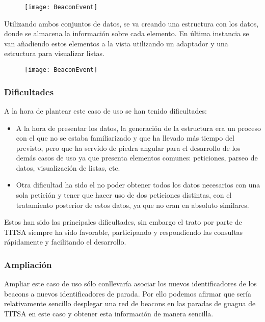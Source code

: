 \begin{figure}[H]
	\centering
	\texttt{[image: BeaconEvent]}
	\label{fig:eventBeacon}
\end{figure}


Utilizando ambos conjuntos de datos, se va creando una estructura con los datos, donde se almacena la información sobre cada elemento. En última instancia se van añadiendo estos elementos a la vista utilizando un adaptador y una estructura para visualizar listas.

\begin{figure}[H]
	\centering
	\texttt{[image: BeaconEvent]}
	\label{fig:eventBeacon}
\end{figure}


\subsubsection{Dificultades}


A la hora de plantear este caso de uso se han tenido dificultades: 

\begin{itemize}
\item A la hora de presentar los datos, la generación de la estructura era un proceso con el que no se estaba familiarizado y que ha llevado más tiempo del previsto, pero que ha servido de piedra angular para el desarrollo de los demás casos de uso ya que presenta elementos comunes: peticiones, parseo de datos, visualización de listas, etc.
\item Otra dificultad ha sido el no poder obtener todos los datos necesarios con una sola petición y tener que hacer uso de dos peticiones distintas, con el tratamiento posterior de estos datos, ya que no eran en absoluto similares.
\end{itemize}

Estos han sido las principales dificultades, sin embargo el trato por parte de TITSA siempre ha sido favorable, participando y respondiendo las consultas rápidamente y facilitando el desarrollo.


\subsubsection{Ampliación}

Ampliar este caso de uso sólo conllevaría asociar los nuevos identificadores de los beacons a nuevos identificadores de parada. Por ello podemos afirmar que sería relativamente sencillo desplegar una red de beacons en las paradas de guagua de TITSA en este caso y obtener esta información de manera sencilla. 


